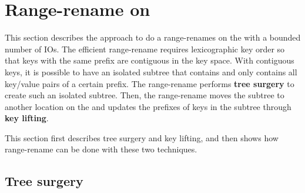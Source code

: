 \section{Range-rename on \bets}

This section describes the approach to do a range-renames on the \bet
with a bounded number of IOs.
The efficient range-rename requires lexicographic key order so that keys with
the same prefix are contiguous in the key space.
With contiguous keys, it is possible to have an isolated subtree that contains
and only contains all key/value pairs of a certain prefix.
The range-rename performs \textbf{tree surgery} to create such an isolated
subtree.
Then, the range-rename moves the subtree to another location on the \bet and
updates the prefixes of keys in the subtree through \textbf{key lifting}.

This section first describes tree surgery and key lifting, and then shows how
range-rename can be done with these two techniques.

\subsection{Tree surgery}

